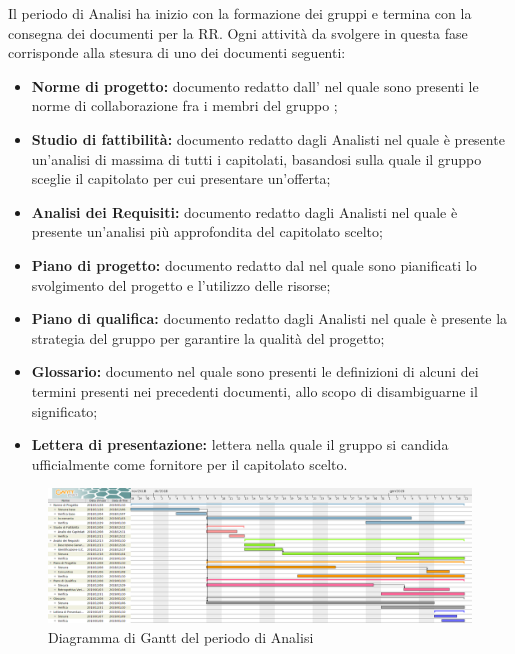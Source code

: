 Il periodo di Analisi ha inizio con la formazione dei gruppi e termina con la consegna dei documenti per la RR. \newline
Ogni attività da svolgere in questa fase corrisponde alla stesura di uno dei documenti seguenti: 
\begin{itemize}
	\item \textbf{Norme di progetto:}
	documento redatto dall'\adm{} nel quale sono presenti le norme di collaborazione fra i membri del gruppo \gruppo ;
	\item \textbf{Studio di fattibilità:}
	documento redatto dagli Analisti nel quale è presente un'analisi di massima di tutti 	i capitolati, basandosi sulla quale il gruppo sceglie il capitolato per cui presentare un'offerta;
	\item \textbf{Analisi dei Requisiti:}
	documento redatto dagli Analisti nel quale è presente un'analisi più approfondita del capitolato scelto;
	\item \textbf{Piano di progetto:}
	documento redatto dal \Res \space nel quale sono pianificati lo svolgimento del progetto e l'utilizzo delle risorse;
	\item \textbf{Piano di qualifica:}
	documento redatto dagli Analisti nel quale è presente la strategia del gruppo \gruppo \space per garantire la qualità del progetto;
	\item \textbf{Glossario:}
	documento nel quale sono presenti le definizioni di alcuni dei termini presenti nei precedenti documenti, allo scopo di disambiguarne il significato;
	\item \textbf{Lettera di presentazione:}
	lettera nella quale il gruppo \gruppo \space si candida ufficialmente come fornitore per il capitolato scelto.
\end{itemize}

\begin{figure}[H]
	\includegraphics[width=1\linewidth]{Pianificazione/Analisi_Gantt.png}
	\caption{Diagramma di Gantt del periodo di Analisi}
\end{figure}
